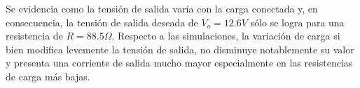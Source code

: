 Se evidencia como la tensión de salida varía con la carga conectada y, en consecuencia, la tensión de salida deseada de $V_{o}=12.6V$ sólo se logra para una resistencia de $R=88.5\Omega$.
Respecto a las simulaciones, la variación de carga si bien modifica levemente la tensión de salida, no disminuye notablemente su valor y presenta una corriente de salida mucho mayor especialmente en las resistencias de carga más bajas.

